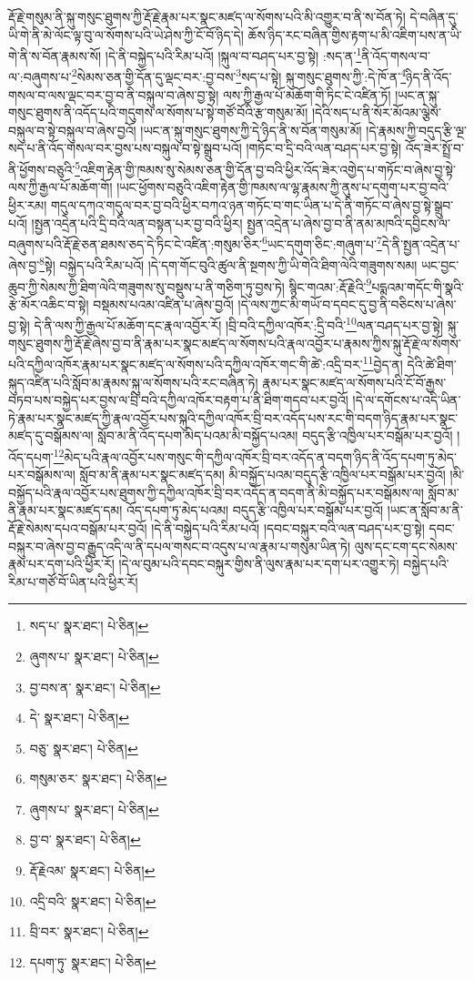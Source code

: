 རྡོ་རྗེ་གསུམ་ནི་སྐུ་གསུང་ཐུགས་ཀྱི་རྡོ་རྗེ་རྣམ་པར་སྣང་མཛད་ལ་སོགས་པའི་མི་འགྱུར་བ་ནི་ས་བོན་ཏེ། དེ་བཞིན་དུ་ཡི་གེ་ནི་མེ་ལོང་ལྟ་བུ་ལ་སོགས་པའི་ཡེ་ཤེས་ཀྱི་ངོ་བོ་ཉིད་དེ། ཆོས་ཉིད་རང་བཞིན་གྱིས་རྟག་པ་མི་འཇིག་པས་ན་ཡི་གེ་ནི་ས་བོན་རྣམས་སོ། །དེ་ནི་བསྐྱེད་པའི་རིམ་པའོ། །སྐུལ་བ་བཤད་པར་བྱ་སྟེ། :སད་ན་\footnote{སད་པ་  སྣར་ཐང་།  པེ་ཅིན། }ནི་འོད་གསལ་བ་ལ་:བཞུགས་པ་\footnote{ཞུགས་པ་  སྣར་ཐང་།  པེ་ཅིན། }སེམས་ཅན་གྱི་དོན་དུ་ལྡང་བར་:བྱ་བས་\footnote{བྱ་བས་ན་  སྣར་ཐང་།  པེ་ཅིན། }སད་པ་སྟེ། སྐུ་གསུང་ཐུགས་ཀྱི་:དེ་ཁོ་ན་\footnote{དེ་  སྣར་ཐང་།  པེ་ཅིན། }ཉིད་ནི་འོད་གསལ་བ་ལས་ལྡང་བར་བྱ་བ་ནི་བསྐུལ་བ་ཞེས་བྱ་སྟེ། ལས་ཀྱི་རྒྱལ་པོ་མཆོག་གི་ཏིང་ངེ་འཛིན་ཏོ། །ཡང་ན་སྐུ་གསུང་ཐུགས་ནི་འདོད་པའི་གདུགས་ལ་སོགས་པ་སྟེ་གཙོ་བོའི་རྩ་གསུམ་མོ། །དེའི་སད་པ་ནི་སོར་མོའམ་ལྕེས་བསྐུལ་བ་སྟེ་བསྐུལ་བ་ཞེས་བྱའོ། །ཡང་ན་སྐུ་གསུང་ཐུགས་ཀྱི་དེ་ཉིད་ནི་ས་བོན་གསུམ་མོ། །དེ་རྣམས་ཀྱི་བདུད་རྩི་ལྔ་སད་པ་ནི་འོད་གསལ་བར་བྱས་པས་བསྐུལ་བ་སྟེ་སྒྲུབ་པའོ། །གཏོང་བ་དྲི་བའི་ལན་བཤད་པར་བྱ་སྟེ། འོད་ཟེར་སྤྲོ་བ་ནི་ཕྱོགས་བཅུའི་\footnote{བཅུ་  སྣར་ཐང་།  པེ་ཅིན། }འཇིག་རྟེན་གྱི་ཁམས་སུ་སེམས་ཅན་གྱི་དོན་བྱ་བའི་ཕྱིར་འོད་ཟེར་འགྱེད་པ་གཏོང་བ་ཞེས་བྱ་སྟེ་ལས་ཀྱི་རྒྱལ་པོ་མཆོག་གོ། །ཡང་ཕྱོགས་བཅུའི་འཇིག་རྟེན་གྱི་ཁམས་ལ་ལྷ་རྣམས་ཀྱི་ནུས་པ་དགུག་པར་བྱ་བའི་ཕྱིར་རམ། གདུལ་དཀའ་གདུལ་བར་བྱ་བའི་ཕྱིར་བཀའ་ཉན་གཏོང་བ་གང་ཡིན་པ་དེ་ནི་གཏོང་བ་ཞེས་བྱ་སྟེ་སྒྲུབ་པའོ། །སྤྱན་འདྲེན་པའི་དྲི་བའི་ལན་བསྟན་པར་བྱ་བའི་ཕྱིར། སྤྱན་འདྲེན་པ་ཞེས་བྱ་བ་ནི་ནམ་མཁའི་དབྱིངས་ལ་བཞུགས་པའི་རྡོ་རྗེ་ཅན་ཐམས་ཅད་དེ་ཏིང་ངེ་འཛིན་:གསུམ་ཅིར་\footnote{གསུམ་ཅར་  སྣར་ཐང་།  པེ་ཅིན། }ཡང་དགུག་ཅིང་:གཞུག་པ་\footnote{ཞུགས་པ་  སྣར་ཐང་།  པེ་ཅིན། }དེ་ནི་སྤྱན་འདྲེན་པ་ཞེས་བྱ་\footnote{བྱ་བ་  སྣར་ཐང་།  པེ་ཅིན། }སྟེ། བསྐྱེད་པའི་རིམ་པའོ། །དེ་དག་གོང་བུའི་ཚུལ་ནི་སྔགས་ཀྱི་ཡི་གེའི་ཐིག་ལེའི་གཟུགས་སམ། ཡང་བྱང་ཆུབ་ཀྱི་སེམས་ཀྱི་ཐིག་ལེའི་གཟུགས་སུ་བསྡུས་པ་ནི་གཅིག་ཏུ་བྱས་ཏེ། སྙིང་གའམ་:རྡོ་རྗེའི་\footnote{རྡོ་རྗེའམ་  སྣར་ཐང་།  པེ་ཅིན། }པདྨའམ་གདོང་གི་སྣའི་རྩེ་མོར་འཆིང་བ་སྟེ། བསྡམས་པའམ་འཛིན་པ་ཞེས་བྱའོ། །དེ་ལས་ཀྱང་མི་གཡོ་བ་དབང་དུ་བྱ་ནི་བཅིངས་པ་ཞེས་བྱ་སྟེ། དེ་ནི་ལས་ཀྱི་རྒྱལ་པོ་མཆོག་དང་རྣལ་འབྱོར་རོ། །བྲི་བའི་དཀྱིལ་འཁོར་:དྲི་བའི་\footnote{འདྲི་བའི་  སྣར་ཐང་།  པེ་ཅིན། }ལན་བཤད་པར་བྱ་སྟེ། སྐུ་གསུང་ཐུགས་ཀྱི་རྡོ་རྗེ་ཞེས་བྱ་བ་ནི་རྣམ་པར་སྣང་མཛད་ལ་སོགས་པའི་རྣལ་འབྱོར་པ་རྣམས་ཀྱིས་སྐུ་རྡོ་རྗེ་ལ་སོགས་པའི་དཀྱིལ་འཁོར་རྣམ་པར་སྣང་མཛད་ལ་སོགས་པའི་དཀྱིལ་འཁོར་གང་གི་ཚེ་:འདྲི་བར་\footnote{བྲི་བར་  སྣར་ཐང་།  པེ་ཅིན། }བྱེད་ན། དེའི་ཚེ་ཐིག་སྐུད་འཛིན་པའི་སློབ་མ་རྣམས་སྐུ་ལ་སོགས་པའི་རང་བཞིན་ཏེ། རྣམ་པར་སྣང་མཛད་ལ་སོགས་པའི་ངོ་བོ་རྒྱས་བཏབ་པས་བསྐྱེད་པར་བྱས་ལ་བྲི་བའི་དཀྱིལ་འཁོར་བརྟག་པ་ནི་ཐིག་གདབ་པར་བྱའོ། །དེ་ལ་དགོངས་པ་འདི་ཡིན་ཏེ་རྣམ་པར་སྣང་མཛད་ཀྱི་རྣལ་འབྱོར་པས་སྐུའི་དཀྱིལ་འཁོར་བྲི་བར་འདོད་པས་རང་གི་བདག་ཉིད་རྣམ་པར་སྣང་མཛད་དུ་བསྒོམས་ལ། སློབ་མ་ནི་འོད་དཔག་མེད་པའམ་མི་བསྐྱོད་པའམ། བདུད་རྩི་འཁྱིལ་པར་བསྒོམ་པར་བྱའོ། །འོད་དཔག་\footnote{དཔག་ཏུ་  སྣར་ཐང་།  པེ་ཅིན། }མེད་པའི་རྣལ་འབྱོར་པས་གསུང་གི་དཀྱིལ་འཁོར་བྲི་བར་འདོད་ན་བདག་ཉིད་ནི་འོད་དཔག་ཏུ་མེད་པར་བསྒོམས་ལ། སློབ་མ་ནི་རྣམ་པར་སྣང་མཛད་དམ། མི་བསྐྱོད་པའམ་བདུད་རྩི་འཁྱིལ་པར་བསྒོམ་པར་བྱའོ། །མི་བསྐྱོད་པའི་རྣལ་འབྱོར་པས་ཐུགས་ཀྱི་དཀྱིལ་འཁོར་བྲི་བར་འདོད་ན་བདག་ནི་མི་བསྐྱོད་པར་བསྒོམས་ལ། སློབ་མ་ནི་རྣམ་པར་སྣང་མཛད་དམ། འོད་དཔག་ཏུ་མེད་པའམ། བདུད་རྩི་འཁྱིལ་པར་བསྒོམ་པར་བྱའོ། །ཡང་ན་སློབ་མ་ནི་རྡོ་རྗེ་སེམས་དཔའ་བསྒོམ་པར་བྱའོ། །དེ་ནི་བསྐྱེད་པའི་རིམ་པའོ། །དབང་བསྐུར་བའི་ལན་བཤད་པར་བྱ་སྟེ། དབང་བསྐུར་བ་ཞེས་བྱ་བ་རྒྱུད་འདི་ལ་ནི་དཔལ་གསང་བ་འདུས་པ་ལ་རྣམ་པ་གསུམ་ཡིན་ཏེ། ལུས་དང་ངག་དང་སེམས་རྣམ་པར་དག་པའི་ཕྱིར་རོ། །དེ་ལ་བུམ་པའི་དབང་བསྐུར་གྱིས་ནི་ལུས་རྣམ་པར་དག་པར་འགྱུར་ཏེ། བསྐྱེད་པའི་རིམ་པ་གཙོ་བོ་ཡིན་པའི་ཕྱིར་རོ། 